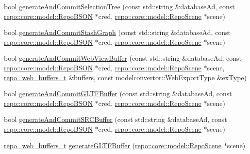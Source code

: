 \begin{DoxyCompactItemize}
\item 
bool \hyperlink{classrepo_1_1manipulator_1_1_repo_manipulator_a62497cff06ac6c294b156a18841a0e84}{generate\+And\+Commit\+Selection\+Tree} (const std\+::string \&database\+Ad, const \hyperlink{classrepo_1_1core_1_1model_1_1_repo_b_s_o_n}{repo\+::core\+::model\+::\+Repo\+B\+S\+O\+N} $\ast$cred, \hyperlink{classrepo_1_1core_1_1model_1_1_repo_scene}{repo\+::core\+::model\+::\+Repo\+Scene} $\ast$scene)
\item 
bool \hyperlink{classrepo_1_1manipulator_1_1_repo_manipulator_a1a095b9f7aabde18f82d42fa063e5a35}{generate\+And\+Commit\+Stash\+Graph} (const std\+::string \&database\+Ad, const \hyperlink{classrepo_1_1core_1_1model_1_1_repo_b_s_o_n}{repo\+::core\+::model\+::\+Repo\+B\+S\+O\+N} $\ast$cred, \hyperlink{classrepo_1_1core_1_1model_1_1_repo_scene}{repo\+::core\+::model\+::\+Repo\+Scene} $\ast$scene)
\item 
bool \hyperlink{classrepo_1_1manipulator_1_1_repo_manipulator_a6a788a9c9dcffc41d41e2a3e3a437d01}{generate\+And\+Commit\+Web\+View\+Buffer} (const std\+::string \&database\+Ad, const \hyperlink{classrepo_1_1core_1_1model_1_1_repo_b_s_o_n}{repo\+::core\+::model\+::\+Repo\+B\+S\+O\+N} $\ast$cred, \hyperlink{classrepo_1_1core_1_1model_1_1_repo_scene}{repo\+::core\+::model\+::\+Repo\+Scene} $\ast$scene, \hyperlink{structrepo__web__buffers__t}{repo\+\_\+web\+\_\+buffers\+\_\+t} \&buffers, const modelconvertor\+::\+Web\+Export\+Type \&ex\+Type)
\item 
bool \hyperlink{classrepo_1_1manipulator_1_1_repo_manipulator_a06bfa2fdc314751c97b45692782dbb1f}{generate\+And\+Commit\+G\+L\+T\+F\+Buffer} (const std\+::string \&database\+Ad, const \hyperlink{classrepo_1_1core_1_1model_1_1_repo_b_s_o_n}{repo\+::core\+::model\+::\+Repo\+B\+S\+O\+N} $\ast$cred, \hyperlink{classrepo_1_1core_1_1model_1_1_repo_scene}{repo\+::core\+::model\+::\+Repo\+Scene} $\ast$scene)
\item 
bool \hyperlink{classrepo_1_1manipulator_1_1_repo_manipulator_a9d02f1f41f76b9140dbb81b5bf413941}{generate\+And\+Commit\+S\+R\+C\+Buffer} (const std\+::string \&database\+Ad, const \hyperlink{classrepo_1_1core_1_1model_1_1_repo_b_s_o_n}{repo\+::core\+::model\+::\+Repo\+B\+S\+O\+N} $\ast$cred, \hyperlink{classrepo_1_1core_1_1model_1_1_repo_scene}{repo\+::core\+::model\+::\+Repo\+Scene} $\ast$scene)
\item 
\hyperlink{structrepo__web__buffers__t}{repo\+\_\+web\+\_\+buffers\+\_\+t} \hyperlink{classrepo_1_1manipulator_1_1_repo_manipulator_afae7f20e2a8e12197fb29a89e9191077}{generate\+G\+L\+T\+F\+Buffer} (\hyperlink{classrepo_1_1core_1_1model_1_1_repo_scene}{repo\+::core\+::model\+::\+Repo\+Scene} $\ast$scene)

\end{DoxyCompactItemize}
